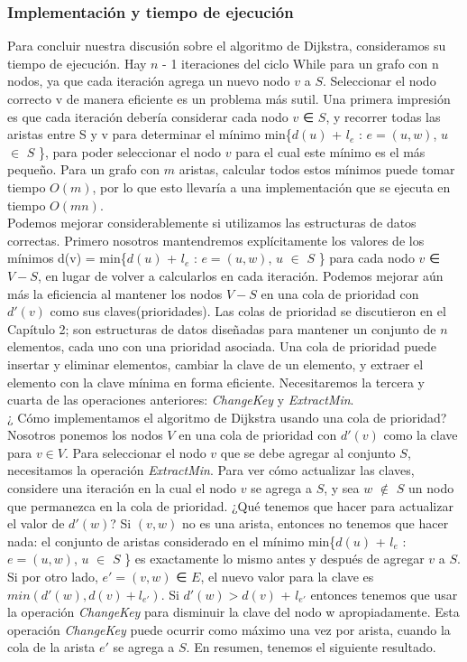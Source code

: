 \documentclass[a4paper]{article}
\begin{document}
\subsubsection*{Implementación y tiempo de ejecución} Para concluir nuestra discusión sobre
el algoritmo de Dijkstra, consideramos su tiempo de ejecución. Hay $n$ - 1 iteraciones del ciclo
While para un grafo con n nodos, ya que cada iteración agrega un nuevo nodo $v$
a $S$. Seleccionar el nodo correcto v de manera eficiente es un problema más sutil. Una primera impresión es que cada iteración debería considerar cada nodo $v$ ∈ $S$,
y recorrer todas las aristas entre S y v para determinar el mínimo
min\{$d (u)$ + $l_e$ : $e = (u, w)$, $u$ \(\in\) $S$ \}, para poder seleccionar el nodo $v$ para el cual este mínimo es el más pequeño. Para un grafo con $m$ aristas, calcular todos estos mínimos
puede tomar tiempo $O(m)$, por lo que esto llevaría a una implementación que se ejecuta en tiempo
$O(mn)$.\\

Podemos mejorar considerablemente si utilizamos las estructuras de datos correctas. Primero nosotros
mantendremos explícitamente los valores de los mínimos d(v) = min\{$d (u)$ + $l_e$ : $e =(u,w)$, $u$ \(\in\) $S$ \}  para cada nodo $v$ ∈ $V - S$, en lugar de volver a calcularlos en cada iteración.
Podemos mejorar aún más la eficiencia al mantener los nodos $V - S$ en una cola de prioridad con 
$d'(v)$ como sus claves(prioridades). Las colas de prioridad se discutieron en el Capítulo 2;
son estructuras de datos diseñadas para mantener un conjunto de $n$ elementos, cada uno con una
prioridad asociada. Una cola de prioridad puede insertar y eliminar elementos, cambiar
la clave de un elemento, y extraer el elemento con la clave mínima en forma eficiente. Necesitaremos
la tercera y cuarta de las operaciones anteriores: \textit{ChangeKey} y \textit{ExtractMin}.\\


¿ Cómo implementamos el algoritmo de Dijkstra usando una cola de prioridad? Nosotros ponemos
los nodos $V$ en una cola de prioridad con $d'(v)$ como la clave para $v \in V$. Para seleccionar el nodo
$v$ que se debe agregar al conjunto $S$, necesitamos la operación \textit{ExtractMin}. Para ver
cómo actualizar las claves, considere una iteración en la cual el nodo $v$ se agrega a $S$, y
sea $w$ \(\notin\) $S$ un nodo que permanezca en la cola de prioridad.
¿Qué tenemos que hacer para actualizar el valor de $d'(w)$? Si $(v, w)$ no es una arista, entonces no tenemos que hacer
nada: el conjunto de aristas considerado en el mínimo min\{$d (u)$ + $l_e$ : $e=(u,w)$, $u$ \(\in\) $S$ \} 
es exactamente lo mismo antes y después de agregar $v$ a $S$. Si por otro lado, $e' = (v, w)$ ∈ $E$, el nuevo valor para la clave es $min (d'(w), d (v) + l_{e'})$. Si $d'(w)> d (v)$ + $l_{e'}$ entonces tenemos que usar la operación \textit{ChangeKey} para disminuir
la clave del nodo w apropiadamente. Esta operación \textit{ChangeKey} puede ocurrir como máximo
una vez por arista, cuando la cola de la arista $e'$ se agrega a $S$. En resumen, tenemos
el siguiente resultado.\\
\end{document}
